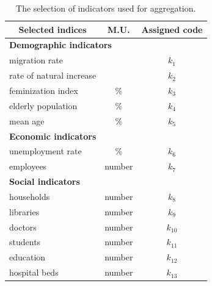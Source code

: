 \begin{table}[ht]
	\centering
	\small
	\begin{tabular}{ ccc }
		\toprule
		\textbf{Selected indices}                               & \textbf{M.U.}             & \textbf{Assigned code} \\
		\midrule
		\multicolumn{3}{l}{\textbf{Demographic indicators}}                                      \\
		\midrule
		\multicolumn{1}{l}{migration rate}           & \textperthousand & $k_1$         \\
		\multicolumn{1}{l}{rate of natural increase} & \textperthousand & $k_2$         \\
		\multicolumn{1}{l}{feminization index}       & \%               & $k_3$         \\
		\multicolumn{1}{l}{elderly population}       & \%               & $k_4$         \\
		\multicolumn{1}{l}{mean age}                 & \%               & $k_5$         \\
		\midrule
		\multicolumn{3}{l}{\textbf{Economic indicators}}                                         \\
		\midrule
		\multicolumn{1}{l}{unemployment rate}        & \%               & $k_6$         \\
		\multicolumn{1}{l}{employees}                & number           & $k_7$         \\
		\midrule
		\multicolumn{3}{l}{\textbf{Social indicators}}                                           \\
		\midrule
		\multicolumn{1}{l}{households}               & number           & $k_8$         \\
		\multicolumn{1}{l}{libraries}                & number           & $k_9$         \\
		\multicolumn{1}{l}{doctors}                  & number           & $k_{10}$      \\
		\multicolumn{1}{l}{students}                 & number           & $k_{11}$      \\
		\multicolumn{1}{l}{education}                & number           & $k_{12}$      \\
		\multicolumn{1}{l}{hospital beds}            & number           & $k_{13}$      \\
		\bottomrule
	\end{tabular}
	\caption{The selection of indicators used for aggregation.}
	\label{table:1}
\end{table}

